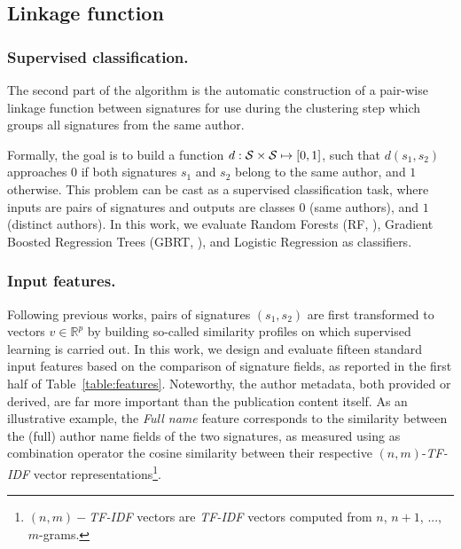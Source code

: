 \documentclass[runningheads,a4paper]{llncs}
\makeatletter
\newcommand*{\eg}{e.g.\@\xspace}
\makeatother
\begin{document}
\subsection{Linkage function}
\label{methods:linkage}


\subsubsection{Supervised classification.} The second part of the algorithm is the
automatic construction of a pair-wise linkage function between signatures for use
during the clustering step which groups all signatures from the same author.

Formally, the goal is to build a function $d: {\cal S} \times {\cal S} \mapsto
[0, 1]$, such that $d(s_1, s_2)$ approaches $0$ if both signatures $s_1$ and
$s_2$ belong to the same author, and $1$ otherwise.
This problem can be cast as a supervised classification task, where inputs
are pairs of signatures and outputs are classes $0$ (same authors), and $1$
(distinct authors). In this work, we evaluate Random Forests (RF, \cite{breiman2001random}),
Gradient Boosted Regression Trees (GBRT, \cite{friedman2001greedy}),
and Logistic Regression \cite{fan2008liblinear} as classifiers.



\subsubsection{Input features.} Following previous works, pairs of signatures $(s_1, s_2)$ are first transformed to vectors $v \in \mathbb{R}^p$
by building so-called similarity profiles \cite{treeratpituk2009disambiguating} on which supervised learning is carried out.
In this work, we design and evaluate fifteen standard input
features \cite{ferreira2012brief, levin2012citation} based on the comparison of signature fields, as reported in the first
half of Table~\ref{table:features}. Noteworthy, the author metadata, both provided or derived, are far more important than the publication content itself.
As an illustrative example, the \textit{Full name} feature corresponds to the similarity between the (full)
author name fields of the two signatures, as measured using as combination
operator the cosine similarity between their respective $(n,m)$-\emph{TF-IDF} vector
representations\footnote{$(n,m)-$\emph{TF-IDF} vectors are \emph{TF-IDF} vectors computed
from $n$, $n+1$, ..., $m$-grams.}.
\end{document}
